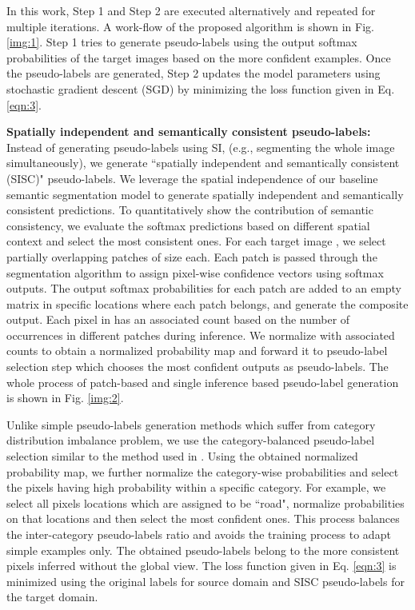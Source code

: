 \documentclass[10pt,twocolumn,letterpaper]{article}
\begin{document}
In this work, Step 1 and Step 2 are executed alternatively and repeated for multiple iterations. A work-flow of the proposed algorithm is shown in Fig. \ref{img:1}. Step 1 tries to generate pseudo-labels using the output softmax probabilities of the target images based on the more confident examples. Once the pseudo-labels are generated, Step 2 updates the model parameters  using stochastic gradient descent (SGD) by minimizing the loss function given in Eq. \ref{eqn:3}. 

\textbf{Spatially independent and semantically consistent pseudo-labels:} Instead of generating pseudo-labels using SI, (e.g., segmenting the whole image simultaneously), we generate ``spatially independent and semantically consistent (SISC)" pseudo-labels. We leverage the spatial independence of our baseline semantic segmentation model to generate spatially independent and semantically consistent predictions. 
To quantitatively show the contribution of semantic consistency, we evaluate the softmax predictions based on different spatial context and select the most consistent ones. For each target image , we select  partially overlapping patches  of size  each. Each patch  is passed through the segmentation algorithm to assign pixel-wise confidence vectors using softmax outputs. 
The output softmax probabilities for each patch are added to an empty matrix  in specific locations where each patch belongs, and generate the composite output. Each pixel in  has an associated count based on the number of occurrences in different patches during inference. We normalize  with associated counts to obtain a normalized probability map and forward it to pseudo-label selection step which chooses the most confident outputs as pseudo-labels. The whole process of patch-based and single inference based pseudo-label generation is shown in Fig. \ref{img:2}. 



Unlike simple pseudo-labels generation methods which suffer from category distribution imbalance problem, we use the category-balanced pseudo-label selection similar to the method used in \cite{zou2018unsupervised}. Using the obtained normalized probability map, we further normalize the category-wise probabilities and select the pixels having high probability within a specific category. For example, we select all pixels locations which are assigned to be ``road", normalize probabilities on that locations and then select the most confident ones. 
This process balances the inter-category pseudo-labels ratio and avoids the training process to adapt simple examples only. The obtained pseudo-labels belong to the more consistent pixels inferred without the global view. The loss function given in Eq. \ref{eqn:3} is minimized using the original labels for source domain and SISC pseudo-labels for the target domain. 
\end{document}
